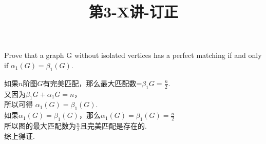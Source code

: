 \documentclass[a4paper, justified]{tufte-handout}
\title{第3-X讲-订正}
\date{\zhtoday} %
\begin{document}
\maketitle
\noplagiarism %
\begin{abstract}
\end{abstract}
\beginrequired





% 



\begincorrection

\begin{problem}[3-12.3 CZ 8.14]
Prove that a graph G without isolated vertices has a perfect matching if and only if   $\alpha_1(G) = \beta_1(G)$.
\end{problem}

\begin{solution}
    如果$n$阶图$G$有完美匹配，那么最大匹配数=$\beta_1{G}=\frac{n}{2}$.\\
    又因为$\beta_1{G}+\alpha_1{G}=n$，\\
    所以可得 $\alpha_1(G) = \beta_1(G)$.\\
    如果$\alpha_1(G) = \beta_1(G)$，那么$\alpha_1(G) = \beta_1(G)=\frac{n}{2}$\\
    所以图的最大匹配数为$\frac{n}{2}$且完美匹配是存在的.\\
    综上得证.
\end{solution}
\end{document}
